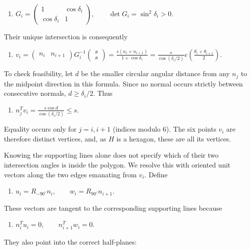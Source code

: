 \begin{enumerate}
 
            \begin{enumerate}[label=(\roman*)]
                \item $G_i= \begin{pmatrix}1&\cos\delta_i\\\cos\delta_i&1\end{pmatrix}, \qquad \det G_i=\sin^2\delta_i>0.$
            \end{enumerate}
            Their unique intersection is consequently

 
            \begin{enumerate}[label=(\roman*)]
                \item $v_i= \begin{pmatrix}n_i&n_{i+1}\end{pmatrix}G_i^{-1} \begin{pmatrix}s\\s\end{pmatrix} =\frac{s(n_i+n_{i+1})}{1+\cos\delta_i} =\frac{s}{\cos(\delta_i/2)} e\!\left(\frac{\theta_i+\theta_{i+1}}2\right).$
            \end{enumerate}
            To check feasibility, let $d$ be the smaller circular angular distance from any $n_j$ to the midpoint direction in this formula. Since no normal occurs strictly between consecutive normals, $d\ge\delta_i/2$. Thus

 
            \begin{enumerate}[label=(\roman*)]
                \item $n_j^Tv_i=\frac{s\cos d}{\cos(\delta_i/2)}\le s.$
            \end{enumerate}
            Equality occurs only for $j=i,i+1$ (indices modulo $6$). The six points $v_i$ are therefore distinct vertices, and, as $H$ is a hexagon, these are all its vertices.

 Knowing the supporting lines alone does not specify which of their two intersection angles is inside the polygon. We resolve this with oriented unit vectors along the two edges emanating from $v_i$. Define

 
            \begin{enumerate}[label=(\roman*)]
                \item $u_i=R_{-90^\circ}n_i,\qquad w_i=R_{90^\circ}n_{i+1}.$
            \end{enumerate}
            These vectors are tangent to the corresponding supporting lines because

 
            \begin{enumerate}[label=(\roman*)]
                \item $n_i^Tu_i=0,\qquad n_{i+1}^Tw_i=0.$
            \end{enumerate}
            They also point into the correct half-planes:


\end{enumerate}
